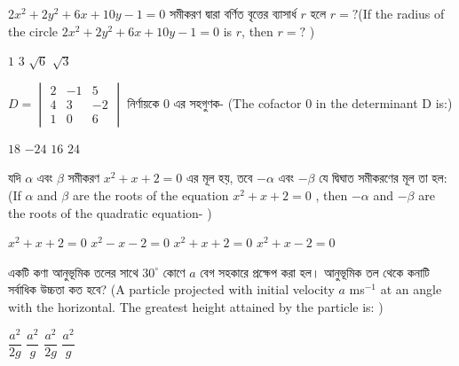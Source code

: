 \documentclass[addpoints]{exam}
\begin{document}
\begin{questions}
\question  $ 2x^{2}+2y^{2}+6x+10y-1=0  $ সমীকরণ দ্বারা বর্ণিত বৃত্তের ব্যাসার্ধ $ r $ হলে $ r=? $(If the radius of the circle $ 2x^{2}+2y^{2}+6x+10y-1=0  $ is $ r $, then $ r=? $ )

\begin{oneparchoices}
\choice $ 1 $
\choice $ 3 $
\choice $ \sqrt{6} $
\choice $ \sqrt{3} $
\end{oneparchoices}

\question  $ D= \begin{vmatrix}
2 & -1 & 5\\
4 & 3 & -2\\
1 & 0 & 6
\end{vmatrix} $ নির্ণায়কে 0 এর  সহগুণক- (The cofactor 0 in the determinant D is:)

\begin{oneparchoices}
\choice $ 18 $
\choice $ -24 $
\choice $ 16 $
\choice $ 24 $
\end{oneparchoices}

\question যদি $ \alpha $ এবং $ \beta $ সমীকরণ $ x^{2}+x+2=0 $ এর মূল হয়, তবে $ -\alpha $ এবং $ -\beta $ যে দ্বিঘাত সমীকরণের মূল তা হল: (If $ \alpha $ and $ \beta $ are the roots of the equation $ x^{2}+x+2=0 $ , then $ -\alpha $ and $ -\beta $ are the roots of the quadratic equation- )

\begin{oneparchoices}
\choice $ x^{2}+x+2=0 $
\choice $ x^{2}-x-2=0 $
\choice $ x^{2}+x+2=0 $
\choice $ x^{2}+x-2=0 $
\end{oneparchoices}



\question একটি কণা আনুভূমিক তলের সাথে $ 30^{\circ} $ কোণে $ a $ বেগ সহকারে প্রক্ষেপ করা হল। আনুভূমিক তল থেকে কনাটি সর্বাধিক উচ্চতা কত হবে? (A particle projected with initial velocity $ a $ ms$ ^{-1} $ at an angle with the horizontal. The greatest height attained by the particle is: )

\begin{oneparchoices}
\choice $\dfrac{a^{2}}{2g} $
\choice $\dfrac{a^{2}}{g} $
\choice $\dfrac{a^{2}}{2g} $
\choice $\dfrac{a^{2}}{g} $
\end{oneparchoices}

\end{questions}
\end{document}

